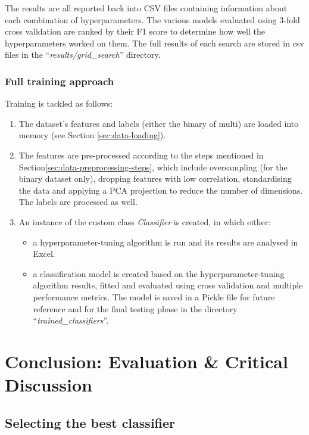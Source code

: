 \documentclass[letterpaper,12pt]{article}
\begin{document}
The results are all reported back into CSV files containing information about each combination of hyperparameters. The various models evaluated using  3-fold cross validation are ranked by their F1 score to determine how well the hyperparameters worked on them. The full results of each search are stored in csv files in the ``\textit{results/grid\_search}'' directory.

\subsubsection{Full training approach}
\label{sec:full-training-approach}

Training is tackled as follows:
\begin{enumerate}
    \item The dataset's features and labels (either the binary of multi) are loaded into memory (see  Section \ref{sec:data-loading}).
    \item The features are pre-processed according to the steps mentioned in Section\ref{sec:data-preprocessing-steps}, which include oversampling (for the binary dataset only), dropping features with low correlation, standardising the data and applying a PCA projection  to reduce the number of dimensions. The labels are processed as well.
    \item An instance of the custom class \textit{Classifier} is created, in which either:
    \begin{itemize}
        \item a hyperparameter-tuning algorithm is run and its results are analysed in Excel.
        \item a classification model is created based on the hyperparameter-tuning algorithm results, fitted and evaluated using cross validation and multiple performance metrics. The model is saved in a Pickle file for future reference and for the final testing phase in the directory ``\textit{trained\_classifiers}''.
    \end{itemize}
\end{enumerate}


\section{Conclusion: Evaluation \& Critical Discussion}
\label{sec:evaluation}

\subsection{Selecting the best classifier}
\end{document}
